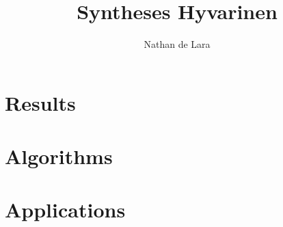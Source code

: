 \documentclass[a4paper,twoside,10pt]{article}
\begin{document}
\pagestyle{empty} %

\title{Syntheses Hyvarinen}

\author{Nathan de Lara}
\maketitle

\section{Results}

\section{Algorithms}

\section{Applications}
 
\end{document}
